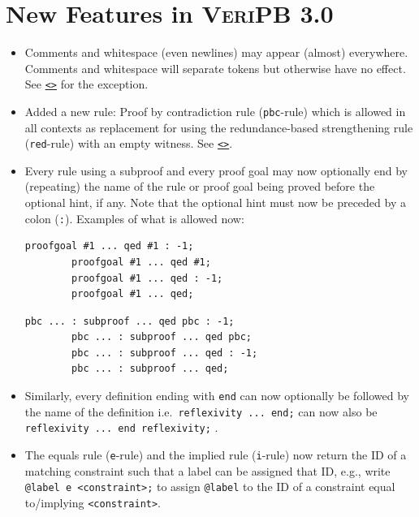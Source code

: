 \documentclass[a4paper]{article}
\newcommand{\lnkBNF}[1]{\hyperlink{def:#1}{<\detokenize{#1}>}}
\newcommand{\veriPB}[0]{\textsc{VeriPB}}
\begin{document}
\section{New Features in \veriPB{} 3.0}\label{sec:new-features}
\begin{itemize}
	\item Comments and whitespace (even newlines) may appear (almost) everywhere. Comments and whitespace will separate tokens but otherwise have no effect. See \texttt{\lnkBNF{header}} for the exception.
	\item Added a new rule: Proof by contradiction rule (\verb!pbc!-rule) which is allowed in all contexts as replacement for using the redundance-based strengthening rule (\verb!red!-rule) with an empty witness. See \texttt{\lnkBNF{pbc_rule}}.
	\item Every rule using a subproof and every proof goal may now optionally end by (repeating) the name of the rule or proof goal being proved before the optional hint, if any. Note that the optional hint must now be preceded by a colon (\verb!:!). Examples of what is allowed now:
	      \\[1mm]
	      \begin{minipage}{.49\linewidth}
		      \begin{lstlisting}[language=veripb, gobble=8]
		proofgoal #1 ... qed #1 : -1;
		proofgoal #1 ... qed #1;
		proofgoal #1 ... qed : -1;
		proofgoal #1 ... qed;
		\end{lstlisting}
	      \end{minipage}\hfill%
	      \begin{minipage}{.49\linewidth}
		      \begin{lstlisting}[language=veripb, gobble=8]
		pbc ... : subproof ... qed pbc : -1;
		pbc ... : subproof ... qed pbc;
		pbc ... : subproof ... qed : -1;
		pbc ... : subproof ... qed;
		\end{lstlisting}
	      \end{minipage}
	\item Similarly, every definition ending with \verb!end! can now optionally be followed by the name of the definition i.e.\ \lstinline[language=veripb]!reflexivity ... end;! can now also be \lstinline[language=veripb]!reflexivity ... end reflexivity;! .
	\item The equals rule (\verb!e!-rule) and the implied rule (\verb!i!-rule) now return the ID of a matching constraint such that a label can be assigned that ID, e.g., write \lstinline[language=veripb]!@label e !\verb!<constraint>;! to assign \lstinline[language=veripb]!@label! to the ID of a constraint equal to/implying \verb!<constraint>!.

\end{itemize}
\end{document}
